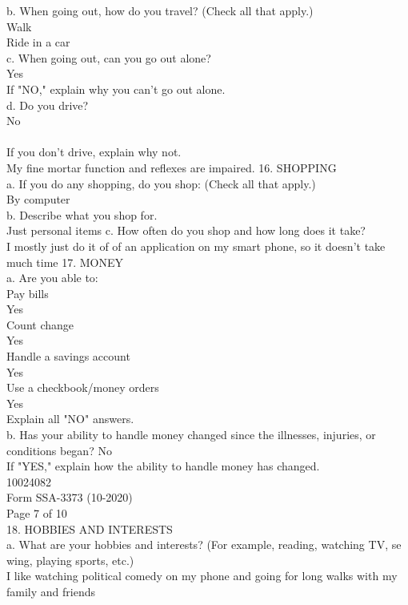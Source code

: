 \documentclass[12pt]{article}
\begin{document}
b. When going out, how do you travel? (Check all that apply.)\\
Walk\\
Ride in a car\\
c. When going out, can you go out alone?\\
Yes\\
If "NO," explain why you can't go out alone.\\
d. Do you drive?\\
No\\
\\
If you don't drive, explain why not.\\
My fine mortar function and reflexes are impaired.
16. SHOPPING\\
a. If you do any shopping, do you shop: (Check all that apply.)\\
By computer\\
b. Describe what you shop for.\\
Just personal items
c. How often do you shop and how long does it take?\\
I mostly just do it of of an application on my smart phone, so it doesn't take much time
17. MONEY\\
a. Are you able to:\\
Pay bills\\
Yes\\
Count change\\
Yes\\
Handle a savings account\\
Yes\\
Use a checkbook/money orders\\
Yes\\
Explain all "NO" answers.\\
b. Has your ability to handle money changed since the illnesses, injuries, or \\conditions began?
No\\
If "YES," explain how the ability to handle money has changed.\\
10024082\\
Form SSA-3373 (10-2020)\\
Page 7 of 10\\
18. HOBBIES AND INTERESTS\\
a. What are your hobbies and interests? (For example, reading, watching TV, se\\wing, playing sports, etc.)\\
I like watching political comedy on my phone and going for long walks with my family and friends
\end{document}
